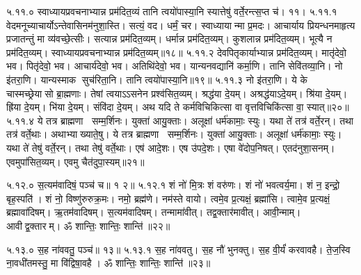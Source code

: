 ५.११.०
स्वाध्यायप्रवचनाभ्यान्न प्रम॑दित॒व्यं तानि त्वयो॑पास्या॒नि स्यात्तेषु॑ वर्ते॒रन्त्स॒प्त च॑। ११।
५.११.१
वेदमनूच्याचार्योऽन्तेवासिनम॑नुशा॒स्ति। सत्यं॒ वद। धर्मं॒ चर। स्वाध्यायान्मा प्र॒मदः। आचार्याय प्रियन्धनमाहृत्य प्रजातन्तुं मा व्य॑वच्छे॒त्सीः। सत्यान्न प्रम॑दित॒व्यम्। धर्मान्न प्रम॑दित॒व्यम्। कुशलान्न प्रम॑दित॒व्यम्। भूत्यै न प्रम॑दित॒व्यम्। स्वाध्यायप्रवचनाभ्यान्न प्रम॑दित॒व्यम्॥१८॥
५.११.२
देवपितृकार्याभ्यान्न प्रम॑दित॒व्यम्। मातृ॑देवो॒ भव। पितृ॑देवो॒ भव। आचार्य॑देवो॒ भव। अतिथि॑देवो॒ भव। यान्यनवद्यानि॑ कर्मा॒णि। तानि सेवि॑तव्या॒नि। नो इ॑तरा॒णि। यान्यस्माक सुच॑रिता॒नि। तानि त्वयो॑पास्या॒नि॥१९॥
५.११.३
नो इ॑तरा॒णि। ये के चास्मच्छ्रेयासो ब्रा॒ह्मणाः। तेषां त्वयाऽऽसनेन प्रश्व॑सित॒व्यम्। श्रद्ध॑या दे॒यम्। अश्रद्ध॑याऽदे॒यम्। श्रि॑या दे॒यम्। ह्रि॑या दे॒यम्। भि॑या दे॒यम्। संवि॑दा दे॒यम्। अथ यदि ते कर्मविचिकित्सा वा वृत्तविचिकि॑त्सा वा॒ स्यात्॥२०॥
५.११.४
ये तत्र ब्राह्मणा सम्म॒र्\mbox{}शिनः। युक्ता॑ आयु॒क्ताः। अलूक्षा॑ धर्म॑कामाः॒ स्युः। यथा ते॑ तत्र॑ वर्ते॒रन्। तथा तत्र॑ वर्ते॒थाः। अथाभ्याख्याते॒षु। ये तत्र ब्राह्मणा सम्म॒र्\mbox{}शिनः। युक्ता॑ आयु॒क्ताः। अलूक्षा॑ धर्म॑कामाः॒ स्युः। यथा ते॑ तेषु॑ वर्ते॒रन्। तथा तेषु॑ वर्ते॒थाः। एष॑ आदे॒शः। एष उ॑पदे॒शः। एषा वे॑दोप॒निषत्। एतद॑नुशा॒सनम्। एवमुपा॑सित॒व्यम्। एवमु चैत॑दुपा॒स्यम्॥२१॥
\anuvakamend

५.१२.०
स॒त्यम॑वादिषं॒ पञ्च॑ च॥ १ २॥
५.१२.१
शं नो॑ मि॒त्रः  शं वरु॑णः। शं नो॑ भवत्वर्य॒मा। शं न॒ इन्द्रो॒ बृह॒स्पति॑। शं नो॒ विष्णु॑रुरुक्र॒मः। नमो॒ ब्रह्म॑णे। नम॑स्ते वायो। त्वमे॒व प्र॒त्यक्षं॒ ब्रह्मा॑सि। त्वामे॒व प्र॒त्यक्षं॒ ब्रह्मावा॑दिषम्। ऋ॒तम॑वादिषम्। स॒त्यम॑वादिषम्। तन्मामा॑वीत्। तद्व॒क्तार॑मावीत्। आवी॒न्माम्। आवीद्व॒क्तारम्। ॐ शान्तिः॒ शान्तिः॒ शान्ति॑॥२२॥

\closesection
\clearpage

\setcounter{anuvakam}{0}
५.१३.०
स॒ह ना॑ववतु॒ पञ्च॑॥ १३॥
५.१३.१
स॒ह ना॑ववतु। स॒ह नौ॑ भुनक्तु। स॒ह वी॒र्यं॑ करवावहै। ते॒ज॒स्वि ना॒वधी॑तमस्तु॒ मा वि॑द्विषा॒वहै। ॐ शान्तिः॒ शान्तिः॒ शान्ति॑॥२३॥
\anuvakamend


